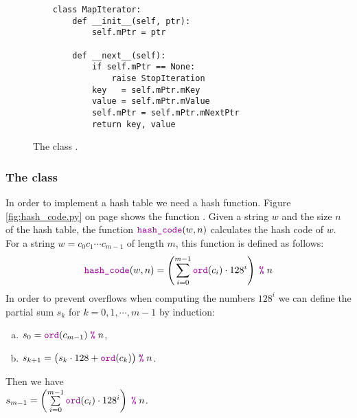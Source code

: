 \begin{figure}[!ht]
\centering
\begin{verbatim}
    class MapIterator:
        def __init__(self, ptr):
            self.mPtr = ptr
        
        def __next__(self):
            if self.mPtr == None:
                raise StopIteration
            key   = self.mPtr.mKey
            value = self.mPtr.mValue
            self.mPtr = self.mPtr.mNextPtr
            return key, value
\end{verbatim}
\vspace*{-0.3cm}
\caption{The class .}
\label{fig:MapIterator.ipynb}
\end{figure}


\subsubsection{The class }
In order to implement a hash table we need a hash function.  Figure \ref{fig:hash_code.py} on page
\pageref{fig:hash_code.py} shows the function .
Given a string $w$ and the size $n$ of the hash table, the function $\mytt{hash\_code}(w, n)$ calculates the
hash code of $w$.  For a string  
$w = c_0c_1\cdots c_{m-1}$ of length $m$, this function is defined as follows:
$$ \mytt{hash\_code}(w, n) = \left(\sum\limits_{i=0}^{m-1} \mytt{ord}(c_i) \cdot 128^i\right) \;\mytt{\symbol{37}}\; n  $$
In order to prevent overflows when computing the numbers $128^i$ we can define the partial sum $s_k$ for
$k=0,1,\cdots,m-1$ by induction:
\begin{enumerate}[(a)]
\item $s_{0} = \mytt{ord}(c_{m-1}) \;\mytt{\symbol{37}}\; n$,
\item $s_{k+1} = \bigl(s_k \cdot 128 + \mytt{ord}(c_{k}) \bigr) \;\mytt{\symbol{37}}\; n$.
\end{enumerate}
Then we have
\\[0.2cm]
\hspace*{1.3cm}
$s_{m-1} = \left(\sum\limits_{i=0}^{m-1} \mytt{ord}(c_i) \cdot 128^i\right) \;\mytt{\symbol{37}}\; n$.

